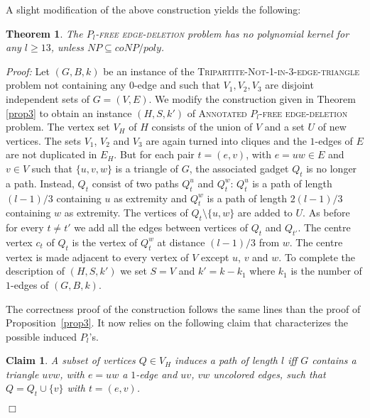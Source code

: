 \documentclass[11pt]{article}
\newenvironment{proof}{\noindent\textit{Proof: }}{{\hfill $\Box$}}
\newtheorem{theorem}[lemma]{Theorem}
\newtheorem{claim}[lemma]{Claim}
\newcommand{\tgbc}{\textsc{Tripartite-Not-1-in-3-edge-triangle}}
\begin{document}
A slight modification of the above construction yields the following:

\begin{theorem} \label{prop4} 
The \textsc{$P_l$-free edge-deletion} problem has no polynomial kernel for any $l \geqslant 13$, unless $NP \subseteq coNP / poly$.
\end{theorem}

\begin{proof}
Let $(G,B,k)$ be an instance of the \tgbc{} problem not containing any $0$-edge and such that $V_1,V_2,V_3$ are disjoint independent sets of $G=(V,E)$. We modify the construction given in Theorem \ref{prop3} to obtain an instance $(H,S,k')$ of \textsc{Annotated $P_l$-free edge-deletion} problem. The vertex set $V_H$ of $H$ consists of the union of $V$ and a set $U$ of new vertices. The sets $V_1$, $V_2$ and $V_3$ are again turned into cliques and the $1$-edges of $E$ are not duplicated in $E_H$. But for each pair $t=(e,v)$, with $e=uw\in E$ and $v\in V$ such that $\{u,v,w\}$ is a triangle of $G$, the associated gadget $Q_t$ is no longer a path. Instead, $Q_t$ consist of two paths $Q_t^u$ and $Q_t^w$: $Q_t^u$ is a path of length $(l-1)/3$ containing $u$ as extremity and $Q_t^w$ is a path of length $2(l-1)/3$ containing $w$ as extremity. The vertices of $Q_t\setminus\{u,w\}$ are added to $U$. As before for every $t\neq t'$ we add all the edges between vertices of $Q_t$ and $Q_{t'}$. The centre vertex $c_t$ of $Q_t$ is the vertex of $Q_t^w$ at distance $(l-1)/3$ from $w$. The centre vertex is made adjacent to every vertex of $V$ except $u$, $v$ and $w$. To complete the description of $(H,S,k')$ we set $S=V$ and $k'=k-k_1$ where $k_1$ is the number of $1$-edges of $(G,B,k)$.

The correctness proof of the construction follows the same lines than the proof of Proposition~\ref{prop3}. It now relies on the following claim that characterizes the possible induced $P_l$'s.

\begin{claim}
\label{claim:nokernel-pl}
A subset of vertices $Q\in V_H$ induces a path of length $l$ iff $G$ contains a triangle $uvw$,  
with $e=uw$ a $1$-edge and $uv$, $vw$ uncolored edges, such that $Q=Q_{t}\cup\{v\}$ with $t=(e,v)$.
\end{claim}


\end{proof}
\end{document}
